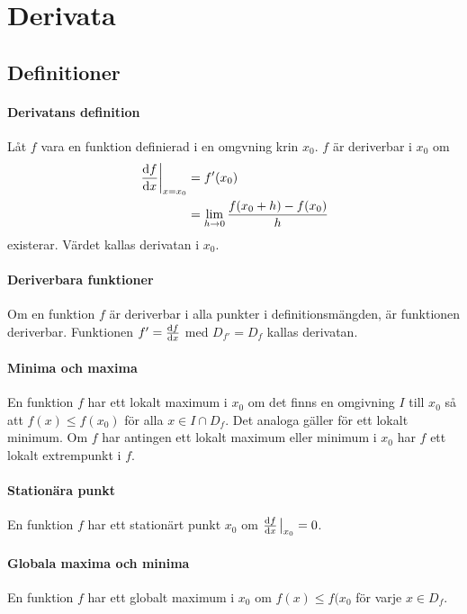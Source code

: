 \section{Derivata}

\subsection{Definitioner}

\paragraph{Derivatans definition}
Låt $f$ vara en funktion definierad i en omgvning krin $x_0$. $f$ är deriverbar i $x_0$ om
\begin{align*}
	\eval{\dv{f}{x}}_{x = x_0} &= f'(x_0) \\
	                           &= \lim\limits_{h\to 0}\frac{f(x_0 + h) - f(x_0)}{h}
\end{align*}
existerar. Värdet kallas derivatan i $x_0$.

\paragraph{Deriverbara funktioner}
Om en funktion $f$ är deriverbar i alla punkter i definitionsmängden, är funktionen deriverbar. Funktionen $f' = \dv{f}{x}$ med $D_{f'} = D_f$ kallas derivatan.

\paragraph{Minima och maxima}
En funktion $f$ har ett lokalt maximum i $x_0$ om det finns en omgivning $I$ till $x_0$ så att $f(x)\leq f(x_0)$ för alla $x\in I\cap D_f$. Det analoga gäller för ett lokalt minimum. Om $f$ har antingen ett lokalt maximum eller minimum i $x_0$ har $f$ ett lokalt extrempunkt i $f$.

\paragraph{Stationära punkt}
En funktion $f$ har ett stationärt punkt $x_0$ om $\dv{f}{x}\eval_{x_0} = 0$.

\paragraph{Globala maxima och minima}
En funktion $f$ har ett globalt maximum i $x_0$ om $f(x)\leq f(x_0$ för varje $x\in D_f$.

